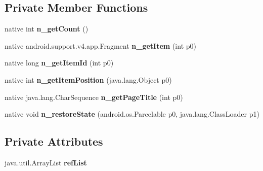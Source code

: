 \subsection*{Private Member Functions}
\begin{DoxyCompactItemize}
\item 
\mbox{\label{classmd5270abb39e60627f0f200893b490a1ade_1_1FormsFragmentPagerAdapter__1_a1a8c2f11836b8ec318f92bc0b1d1c1fa}} 
native int {\bfseries n\+\_\+get\+Count} ()
\item 
\mbox{\label{classmd5270abb39e60627f0f200893b490a1ade_1_1FormsFragmentPagerAdapter__1_aee0c06a0d33282513e5e577ec4d11f92}} 
native android.\+support.\+v4.\+app.\+Fragment {\bfseries n\+\_\+get\+Item} (int p0)
\item 
\mbox{\label{classmd5270abb39e60627f0f200893b490a1ade_1_1FormsFragmentPagerAdapter__1_ac92c06a73a03bbf1c890db05f3e9fb85}} 
native long {\bfseries n\+\_\+get\+Item\+Id} (int p0)
\item 
\mbox{\label{classmd5270abb39e60627f0f200893b490a1ade_1_1FormsFragmentPagerAdapter__1_a84b7d4e1e9df9aba392089a18608a379}} 
native int {\bfseries n\+\_\+get\+Item\+Position} (java.\+lang.\+Object p0)
\item 
\mbox{\label{classmd5270abb39e60627f0f200893b490a1ade_1_1FormsFragmentPagerAdapter__1_a2660ebffd7dc94c56dec8e3d987f48c9}} 
native java.\+lang.\+Char\+Sequence {\bfseries n\+\_\+get\+Page\+Title} (int p0)
\item 
\mbox{\label{classmd5270abb39e60627f0f200893b490a1ade_1_1FormsFragmentPagerAdapter__1_adbf99747b00bb31865eab9b5717bbc0b}} 
native void {\bfseries n\+\_\+restore\+State} (android.\+os.\+Parcelable p0, java.\+lang.\+Class\+Loader p1)
\end{DoxyCompactItemize}
\subsection*{Private Attributes}
\begin{DoxyCompactItemize}
\item 
\mbox{\label{classmd5270abb39e60627f0f200893b490a1ade_1_1FormsFragmentPagerAdapter__1_aaa9e57dd2fbab5e679b3261739ea5a57}} 
java.\+util.\+Array\+List {\bfseries ref\+List}
\end{DoxyCompactItemize}


